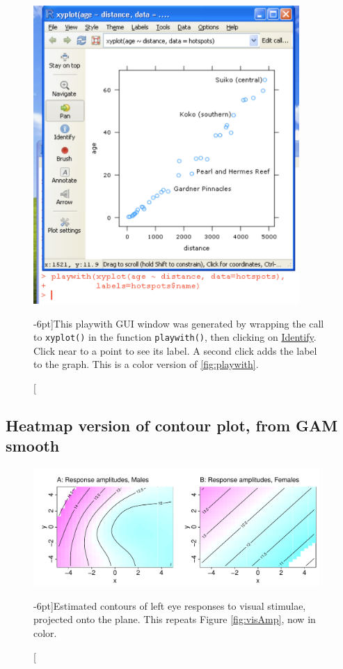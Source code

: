\begin{figure}[h]
\centerline{\includegraphics[width=0.9\textwidth]{colorArt/playwith}}%
\caption[][-6pt]{This playwith GUI window was generated by wrapping the call
  to \texttt{xyplot()} in the function \texttt{playwith()}, then
  clicking on \underline{Identify}. Click near to a point to see its
  label. A second click adds the label to the graph.  This is a color version
of \ref{fig:playwith}.\label{col:playwith}}
\end{figure}

\newpage
\subsection*{Heatmap version of contour plot, from GAM smooth}

\begin{fullwidth}
\begin{figure}
\begin{Schunk}
\centerline{\includegraphics[width=0.97\textwidth]{colorArt/18i-further-plotVIS} }
\end{Schunk}
\caption[][-6pt]{Estimated contours of left eye responses to visual stimulae,
projected onto the plane.  This repeats Figure \ref{fig:visAmp},
now in color.\label{col:visAmp}}
\vspace*{12pt}
\end{figure}
\end{fullwidth}

